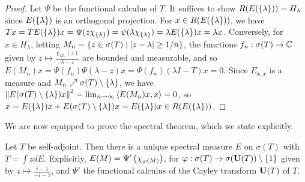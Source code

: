 \documentclass[10pt]{amsart}
\begin{document}
\begin{proof}
    Let $\Psi$ be the functional calculus of $T$. It suffices to show $R(E(\left\{  \lambda  \right\})) = H_\lambda$ since $E(\left\{  \lambda  \right\})$ is an orthogonal projection. For $x \in R(E(\left\{  \lambda  \right\}))$, we have $Tx = TE(\left\{  \lambda  \right\})x = \Psi(z\chi_{\left\{  \lambda  \right\}}) = \psi(\lambda\chi_{\left\{  \lambda  \right\}}) = \lambda E(\left\{  \lambda  \right\})x = \lambda x$. Conversely, for $x \in H_\lambda$, letting $M_n = \left\{  z \in \sigma(T) \mid \left| z - \lambda \right| \geq 1/n  \right\}$, the functions $f_n : \sigma(T) \to \mathbb{C}$ given by $z \mapsto \frac{\chi_{M_n}(z)}{\lambda - z}$ are bounded and measurable, and so $E(M_n)x = \Psi(f_n)\Psi(\lambda - z)x = \Psi(f_n)(\lambda I - T)x = 0$. Since $E_{x, x}$ is a measure and $M_n \nearrow \sigma(T) \setminus \left\{  \lambda  \right\}$, we have $\left\| E(\sigma(T) \setminus \left\{  \lambda  \right\})x \right\|^2 = \lim_{n \to \infty}\left\langle E(M_n)x, x \right\rangle = 0$, so $x = E(\left\{  \lambda  \right\})x + E(\sigma(T) \setminus\left\{  \lambda  \right\})x = E(\left\{  \lambda  \right\})x \in R(E(\left\{  \lambda  \right\}))$.
\end{proof}
We are now equipped to prove the spectral theorem, which we state explicitly.
\begin{theorem}
    Let $T$ be self-adjoint. Then there is a unique spectral measure $E$ on $\sigma(T)$ with $T = \int z dE$. Explicitly, $E(M) = \Psi'\left(  \chi_{\varphi(M)}  \right)$, for $\varphi : \sigma(T) \to \sigma(\mathbf{U}(T)) \setminus \left\{  1  \right\}$ given by $z \mapsto \frac{i - z}{-i - z}$, and $\Psi'$ the functional calculus of the Cayley transform $\mathbf{U}(T)$ of $T$.
\end{theorem}
\end{document}
